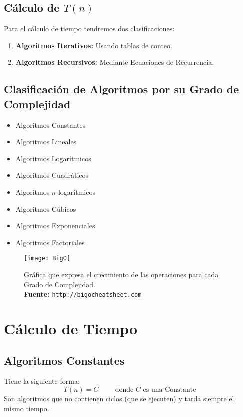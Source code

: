 \subsection{Cálculo de $T(n)$}
Para el cálculo de tiempo tendremos dos clasificaciones:
\begin{enumerate}
\item \textbf{Algoritmos Iterativos:} Usando tablas de conteo.
\item \textbf{Algoritmos Recursivos:} Mediante Ecuaciones de Recurrencia.
\end{enumerate}
\subsection{Clasificación de Algoritmos por su Grado de Complejidad}
\begin{multicols}{2}
\begin{itemize}
\item Algoritmos Constantes
\item Algoritmos Lineales
\item Algoritmos Logarítmicos
\item Algoritmos Cuadráticos
\end{itemize}
\columnbreak
\begin{itemize}
\item Algoritmos $n$-logarítmicos
\item Algoritmos Cúbicos
\item Algoritmos Exponenciales
\item Algoritmos Factoriales
\end{itemize}
\end{multicols}


\begin{figure}[h]
\centering
\texttt{[image: BigO]}
\captionsetup{justification=centering}
\caption[caption]{\footnotesize Gráfica que expresa el crecimiento de las operaciones para cada Grado de Complejidad. \\ \textbf{Fuente:} \texttt{http://bigocheatsheet.com}}
\end{figure}
\section{Cálculo de Tiempo}
\subsection{Algoritmos Constantes}
Tiene la siguiente forma:
$$T(n)=C \hspace{1cm} \textrm{donde $C$ es una Constante}$$
Son algoritmos que no contienen ciclos (que se ejecuten) y tarda siempre el mismo tiempo.

